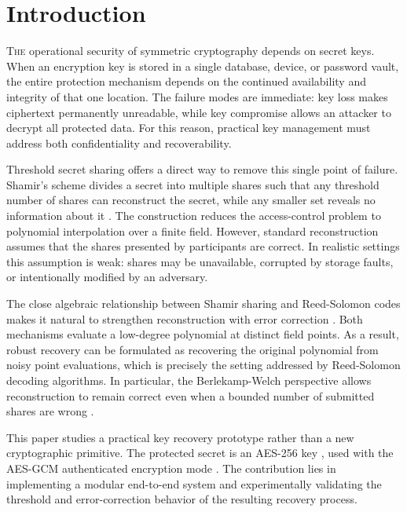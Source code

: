 \section{Introduction}

\lettrine[lines=3,lhang=0.08,loversize=0.15,findent=0.5em,nindent=0em]{T}{he} operational security of symmetric cryptography depends on secret keys. When an encryption key is stored in a single database, device, or password vault, the entire protection mechanism depends on the continued availability and integrity of that one location. The failure modes are immediate: key loss makes ciphertext permanently unreadable, while key compromise allows an attacker to decrypt all protected data. For this reason, practical key management must address both confidentiality and recoverability.

Threshold secret sharing offers a direct way to remove this single point of failure. Shamir's scheme divides a secret into multiple shares such that any threshold number of shares can reconstruct the secret, while any smaller set reveals no information about it \cite{shamir1979}. The construction reduces the access-control problem to polynomial interpolation over a finite field. However, standard reconstruction assumes that the shares presented by participants are correct. In realistic settings this assumption is weak: shares may be unavailable, corrupted by storage faults, or intentionally modified by an adversary.

The close algebraic relationship between Shamir sharing and Reed-Solomon codes makes it natural to strengthen reconstruction with error correction \cite{reedsolomon1960}. Both mechanisms evaluate a low-degree polynomial at distinct field points. As a result, robust recovery can be formulated as recovering the original polynomial from noisy point evaluations, which is precisely the setting addressed by Reed-Solomon decoding algorithms. In particular, the Berlekamp-Welch perspective allows reconstruction to remain correct even when a bounded number of submitted shares are wrong \cite{fedorenko2005}.

This paper studies a practical key recovery prototype rather than a new cryptographic primitive. The protected secret is an AES-256 key \cite{fips197}, used with the AES-GCM authenticated encryption mode \cite{sp80038d}. The contribution lies in implementing a modular end-to-end system and experimentally validating the threshold and error-correction behavior of the resulting recovery process.

